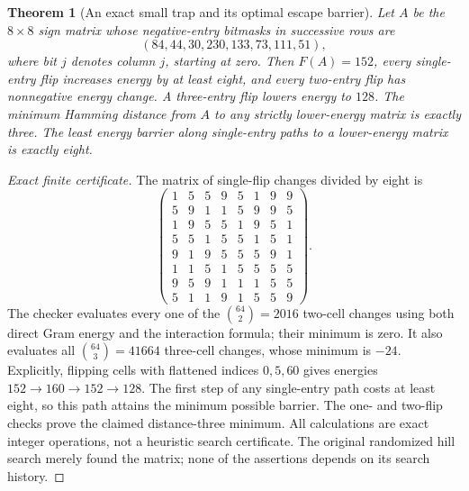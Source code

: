 \documentclass[11pt]{article}
\newtheorem{theorem}{Theorem}[section]
\begin{document}
\begin{theorem}[An exact small trap and its optimal escape barrier]
\label{thm:spectral-eight-trap}
Let $A$ be the $8\times8$ sign matrix whose negative-entry bitmasks in
successive rows are
\[
 (84,44,30,230,133,73,111,51),
\]
where bit $j$ denotes column $j$, starting at zero. Then $F(A)=152$,
every single-entry flip increases energy by at least eight, and every
two-entry flip has nonnegative energy change. A three-entry flip lowers
energy to $128$. The minimum Hamming distance from $A$ to any
strictly lower-energy matrix is exactly three. The least energy barrier
along single-entry paths to a lower-energy matrix is exactly eight.
\end{theorem}
\begin{proof}[Exact finite certificate]
The matrix of single-flip changes divided by eight is
\[
 \begin{pmatrix}
 1&5&5&9&5&1&9&9\\
 5&9&1&1&5&9&9&5\\
 1&9&5&5&1&9&5&1\\
 5&5&1&5&5&1&5&1\\
 9&1&9&5&5&5&9&1\\
 1&1&5&1&5&5&5&5\\
 9&5&9&1&1&1&5&5\\
 5&1&1&9&1&5&5&9
 \end{pmatrix}.
\]
The checker evaluates every one of the $\binom{64}{2}=2016$ two-cell
changes using both direct Gram energy and the interaction formula;
their minimum is zero. It also evaluates all $\binom{64}{3}=41664$
three-cell changes, whose minimum is $-24$. Explicitly, flipping cells
with flattened indices $0,5,60$ gives energies
$152\to160\to152\to128$. The first step of any single-entry path
costs at least eight, so this path attains the minimum possible barrier.
The one- and two-flip checks prove the claimed distance-three minimum.
All calculations are exact integer operations, not a heuristic search
certificate. The original randomized hill search merely found the
matrix; none of the assertions depends on its search history.
\end{proof}
\end{document}
